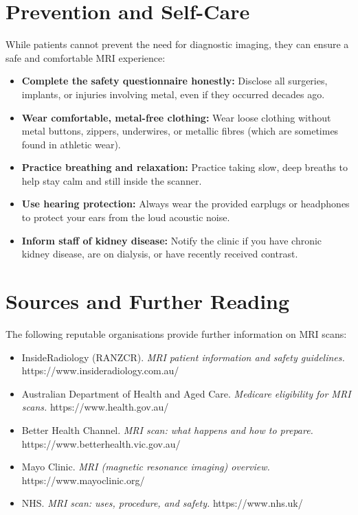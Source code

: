 \section*{Prevention and Self-Care}
While patients cannot prevent the need for diagnostic imaging, they can ensure a safe and comfortable MRI experience:
\begin{itemize}
    \item \textbf{Complete the safety questionnaire honestly:} Disclose all surgeries, implants, or injuries involving metal, even if they occurred decades ago.
    \item \textbf{Wear comfortable, metal-free clothing:} Wear loose clothing without metal buttons, zippers, underwires, or metallic fibres (which are sometimes found in athletic wear).
    \item \textbf{Practice breathing and relaxation:} Practice taking slow, deep breaths to help stay calm and still inside the scanner.
    \item \textbf{Use hearing protection:} Always wear the provided earplugs or headphones to protect your ears from the loud acoustic noise.
    \item \textbf{Inform staff of kidney disease:} Notify the clinic if you have chronic kidney disease, are on dialysis, or have recently received contrast.
\end{itemize}

\section*{Sources and Further Reading}
The following reputable organisations provide further information on MRI scans:
\begin{itemize}
    \item InsideRadiology (RANZCR). \textit{MRI patient information and safety guidelines.} https://www.insideradiology.com.au/
    \item Australian Department of Health and Aged Care. \textit{Medicare eligibility for MRI scans.} https://www.health.gov.au/
    \item Better Health Channel. \textit{MRI scan: what happens and how to prepare.} https://www.betterhealth.vic.gov.au/
    \item Mayo Clinic. \textit{MRI (magnetic resonance imaging) overview.} https://www.mayoclinic.org/
    \item NHS. \textit{MRI scan: uses, procedure, and safety.} https://www.nhs.uk/
\end{itemize}
